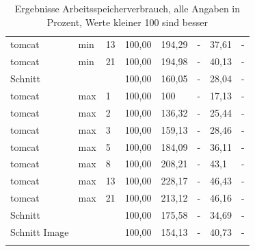\begin{footnotesize}
\begin{longtable}{llllllll}
		tomcat         & min     & 13         & 100,00 & 194,29                      & -                           & 37,61                       & -                           \\
		tomcat         & min     & 21         & 100,00 & 194,98                      & -                           & 40,13                       & -                           \\ \hline
		Schnitt        &         &            & 100,00 & 160,05                      & -                           & 28,04                       & -                           \\ \hline
		tomcat         & max     & 1          & 100,00 & \cellcolor[HTML]{C0C0C0}100 & -                           & 17,13                       & -                           \\
		tomcat         & max     & 2          & 100,00 & 136,32                      & -                           & 25,44                       & -                           \\
		tomcat         & max     & 3          & 100,00 & 159,13                      & -                           & 28,46                       & -                           \\
		tomcat         & max     & 5          & 100,00 & 184,09                      & -                           & 36,11                       & -                           \\
		tomcat         & max     & 8          & 100,00 & 208,21                      & -                           & 43,1                        & -                           \\
		tomcat         & max     & 13         & 100,00 & 228,17                      & -                           & 46,43                       & -                           \\
		tomcat         & max     & 21         & 100,00 & 213,12                      & -                           & 46,16                       & -                           \\ \hline
		Schnitt        &         &            & 100,00 & 175,58                      & -                           & 34,69                       & -                           \\ \hline
		Schnitt Image  &         &            & 100,00 & 154,13                      & -                           & 40,73                       & -                           \\ \hline
		\caption[Ergebnisse Arbeitsspeicherverbrauch]{Ergebnisse Arbeitsspeicherverbrauch, \footnotesize alle Angaben in Prozent,  Werte kleiner 100 sind besser}
		\label{tbl:ramdetailauswertung}
	\end{longtable}
\end{footnotesize}

